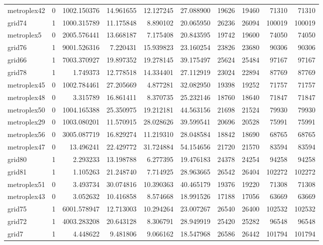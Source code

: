 \begin{longtable}{|l|r|r|r|r|r|r|r|r|r|}
metroplex42 & 0 & 1002.150376 & 14.961655 & 12.127245 & 27.088900 & 19626 & 19460 & 71310 & 71310 \\
grid74 & 1 & 1000.315789 & 11.175848 & 8.890102 & 20.065950 & 26236 & 26094 & 100019 & 100019 \\
metroplex5 & 0 & 2005.576441 & 13.668187 & 7.175408 & 20.843595 & 19742 & 19600 & 74050 & 74050 \\
grid76 & 1 & 9001.526316 & 7.220431 & 15.939823 & 23.160254 & 23826 & 23680 & 90306 & 90306 \\
grid66 & 1 & 7003.370927 & 19.897352 & 19.278145 & 39.175497 & 25624 & 25484 & 97167 & 97167 \\
grid78 & 1 & 1.749373 & 12.778518 & 14.334401 & 27.112919 & 23024 & 22894 & 87769 & 87769 \\
metroplex45 & 0 & 1002.784461 & 27.205669 & 4.877281 & 32.082950 & 19398 & 19252 & 71757 & 71757 \\
metroplex48 & 0 & 3.315789 & 16.861411 & 8.370735 & 25.232146 & 18760 & 18640 & 71847 & 71847 \\
metroplex50 & 0 & 1004.165388 & 25.350975 & 19.212181 & 44.563156 & 21698 & 21524 & 79930 & 79930 \\
metroplex29 & 0 & 1003.080201 & 11.570915 & 28.028626 & 39.599541 & 20696 & 20528 & 75991 & 75991 \\
metroplex56 & 0 & 3005.087719 & 16.829274 & 11.219310 & 28.048584 & 18842 & 18690 & 68765 & 68765 \\
metroplex47 & 0 & 13.496241 & 22.429772 & 31.724884 & 54.154656 & 21720 & 21570 & 83594 & 83594 \\
grid80 & 1 & 2.293233 & 13.198788 & 6.277395 & 19.476183 & 24378 & 24254 & 94258 & 94258 \\
grid81 & 1 & 1.105263 & 21.248740 & 7.714925 & 28.963665 & 26542 & 26404 & 102272 & 102272 \\
metroplex51 & 0 & 3.493734 & 30.074816 & 10.390363 & 40.465179 & 19376 & 19220 & 71308 & 71308 \\
metroplex43 & 0 & 3.052632 & 10.416858 & 8.574668 & 18.991526 & 17188 & 17056 & 63669 & 63669 \\
grid75 & 1 & 6001.578947 & 12.713003 & 10.294264 & 23.007267 & 26540 & 26400 & 102532 & 102532 \\
grid72 & 1 & 4003.283208 & 20.643128 & 8.306791 & 28.949919 & 25420 & 25282 & 96548 & 96548 \\
grid7 & 1 & 4.448622 & 9.481806 & 9.066162 & 18.547968 & 26586 & 26442 & 101794 & 101794 \\

\end{longtable}
